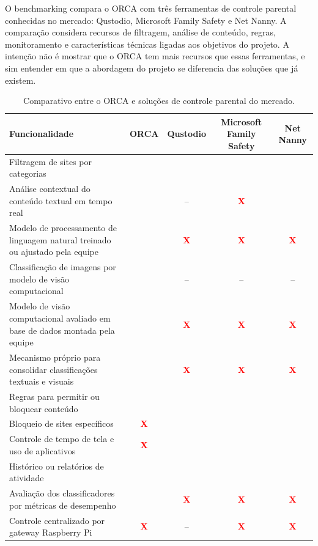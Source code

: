 \documentclass[
    12pt,           %
    oneside,        %
    a4paper,        %
    chapter=TITLE,  %
    english,        %
    brazil          %
]{abntex2}
\newcommand{\cmark}{\textcolor{green!60!black}{\ding{51}}}  %
\newcommand{\xmark}{\textcolor{red}{\textbf{X}}}            %
\begin{document}
O benchmarking compara o ORCA com três ferramentas de controle parental
conhecidas no mercado: Qustodio, Microsoft Family Safety e Net Nanny. A
comparação considera recursos de filtragem, análise de conteúdo, regras,
monitoramento e características técnicas ligadas aos objetivos do projeto. A
intenção não é mostrar que o ORCA tem mais recursos que essas ferramentas, e
sim entender em que a abordagem do projeto se diferencia das soluções que já
existem.
\begin{table}[htbp]
\centering
\small
\renewcommand{\arraystretch}{1.4}
\begin{tabular}{|p{5.0cm}|c|c|c|c|}
\hline
\textbf{Funcionalidade} & \textbf{ORCA} & \textbf{Qustodio} & \textbf{Microsoft Family Safety} & \textbf{Net Nanny} \\
\hline
Filtragem de sites por categorias & \cmark & \cmark & \cmark & \cmark \\
\hline
Análise contextual do conteúdo textual em tempo real & \cmark & -- & \xmark & \cmark \\
\hline
Modelo de processamento de linguagem natural treinado ou ajustado pela equipe & \cmark & \xmark & \xmark & \xmark \\
\hline
Classificação de imagens por modelo de visão computacional & \cmark & -- & -- & -- \\
\hline
Modelo de visão computacional avaliado em base de dados montada pela equipe & \cmark & \xmark & \xmark & \xmark \\
\hline
Mecanismo próprio para consolidar classificações textuais e visuais & \cmark & \xmark & \xmark & \xmark \\
\hline
Regras para permitir ou bloquear conteúdo & \cmark & \cmark & \cmark & \cmark \\
\hline
Bloqueio de sites específicos & \xmark & \cmark & \cmark & \cmark \\
\hline
Controle de tempo de tela e uso de aplicativos & \xmark & \cmark & \cmark & \cmark \\
\hline
Histórico ou relatórios de atividade & \cmark & \cmark & \cmark & \cmark \\
\hline
Avaliação dos classificadores por métricas de desempenho & \cmark & \xmark & \xmark & \xmark \\
\hline
Controle centralizado por gateway Raspberry Pi & \xmark & -- & \xmark & \xmark \\
\hline
\end{tabular}
\caption{Comparativo entre o ORCA e soluções de controle parental do mercado.}
\label{tab:benchmarking}
\end{table}
\end{document}
